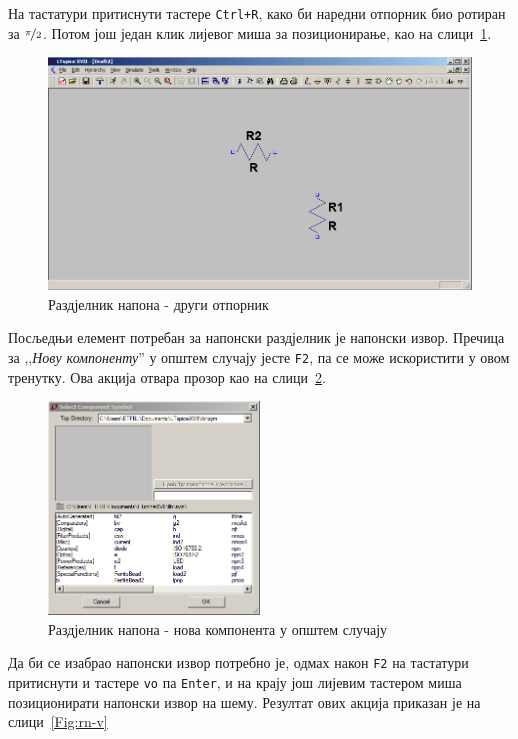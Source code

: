 На тастатури притиснути тастере \texttt{Ctrl+R}, како би наредни отпорник био ротиран за $\nicefrac{\pi}{2}$. Потом још један клик лијевог миша за позиционирање, као на слици~\ref{Fig:rn-r2}.

\begin{figure}[h]
\centering
\includegraphics[width=\figwidth\textwidth]{figs/rn-r2.PNG}
\caption{Раздјелник напона - други отпорник}
\label{Fig:rn-r2}
\end{figure}

Посљедњи елемент потребан за напонски раздјелник је напонски извор. Пречица за ,,\textit{Нову компоненту}'' у општем случају јесте \texttt{F2}, па се може искористити у овом тренутку. Ова акција отвара прозор као на слици~\ref{Fig:rn-f2}.

\begin{figure}[h]
\centering
\includegraphics[width=0.5\textwidth]{figs/rn-f2.PNG}
\caption{Раздјелник напона - нова компонента у општем случају}
\label{Fig:rn-f2}
\end{figure}

Да би се изабрао напонски извор потребно је, одмах након \texttt{F2} на тастатури притиснути и тастере \texttt{vo} па \texttt{Enter}, и на крају још лијевим тастером миша позиционирати напонски извор на шему. Резултат ових акција приказан је на слици~\ref{Fig:rn-v}

